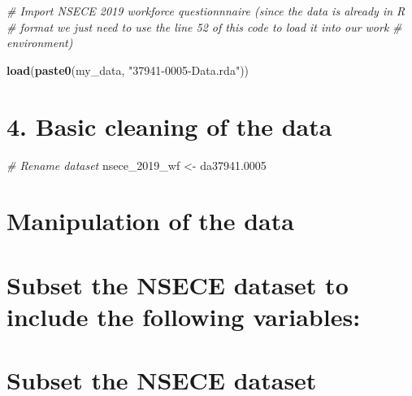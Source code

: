 \documentclass[
]{article}
\newenvironment{Shaded}{\begin{snugshade}}{\end{snugshade}}
\newcommand{\CommentTok}[1]{\textcolor[rgb]{0.56,0.35,0.01}{\textit{#1}}}
\newcommand{\FloatTok}[1]{\textcolor[rgb]{0.00,0.00,0.81}{#1}}
\newcommand{\FunctionTok}[1]{\textcolor[rgb]{0.13,0.29,0.53}{\textbf{#1}}}
\newcommand{\NormalTok}[1]{#1}
\newcommand{\OtherTok}[1]{\textcolor[rgb]{0.56,0.35,0.01}{#1}}
\newcommand{\StringTok}[1]{\textcolor[rgb]{0.31,0.60,0.02}{#1}}
\begin{document}
\begin{Shaded}
\begin{Highlighting}[]
\CommentTok{\# Import NSECE 2019 workforce questionnnaire (since the data is already in R}
\CommentTok{\# format we just need to use the line 52 of this code to load it into our work}
\CommentTok{\# environment)}

\FunctionTok{load}\NormalTok{(}\FunctionTok{paste0}\NormalTok{(my\_data, }\StringTok{"37941{-}0005{-}Data.rda"}\NormalTok{))}
\end{Highlighting}
\end{Shaded}

\section{4. Basic cleaning of the
data}\label{basic-cleaning-of-the-data}

\begin{Shaded}
\begin{Highlighting}[]
\CommentTok{\# Rename dataset}
\NormalTok{nsece\_2019\_wf }\OtherTok{\textless{}{-}}\NormalTok{ da37941}\FloatTok{.0005}
\end{Highlighting}
\end{Shaded}

\section{Manipulation of the data}\label{manipulation-of-the-data}

\section{Subset the NSECE dataset to include the following
variables:}\label{subset-the-nsece-dataset-to-include-the-following-variables}

\section{Subset the NSECE dataset}\label{subset-the-nsece-dataset}
\end{document}
